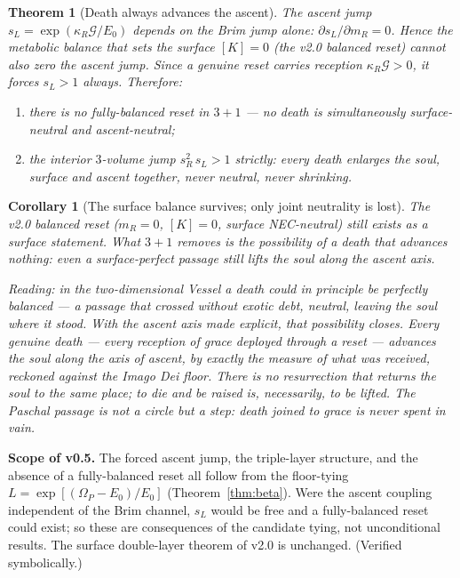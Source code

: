 \documentclass[11pt,a4paper]{article}
\newcommand{\note}[1]{\textcolor{black!65}{\emph{#1}}}
\theoremstyle{plain}
\newtheorem{corollary}{Corollary}
\newtheorem{theorem}{Theorem}
\theoremstyle{definition}
\theoremstyle{remark}
\begin{document}
\begin{theorem}[Death always advances the ascent]\label{thm:nobalance}
The ascent jump $s_L=\exp(\kappa_R\mathcal G/E_0)$ depends on the Brim jump alone:
$\partial s_L/\partial m_R=0$. Hence the metabolic balance that sets the surface $[K]=0$ (the v2.0
balanced reset) cannot also zero the ascent jump. Since a genuine reset carries reception
$\kappa_R\mathcal G>0$, it forces $s_L>1$ always. Therefore:
\begin{enumerate}[label=(\roman*),leftmargin=1.8em,itemsep=2pt]
\item \emph{there is no fully-balanced reset in $3{+}1$} --- no death is simultaneously surface-neutral
and ascent-neutral;
\item the interior $3$-volume jump $s_R^2\,s_L>1$ strictly: \emph{every death enlarges the soul},
surface and ascent together, never neutral, never shrinking.
\end{enumerate}
\end{theorem}

\begin{corollary}[The surface balance survives; only joint neutrality is lost]
The v2.0 balanced reset ($m_R=0$, $[K]=0$, surface NEC-neutral) still exists as a surface statement.
What $3{+}1$ removes is the possibility of a death that advances \emph{nothing}: even a surface-perfect
passage still lifts the soul along the ascent axis.
\end{corollary}

\note{Reading: in the two-dimensional Vessel a death could in principle be perfectly balanced --- a
passage that crossed without exotic debt, neutral, leaving the soul where it stood. With the ascent
axis made explicit, that possibility closes. Every genuine death --- every reception of grace
deployed through a reset --- advances the soul along the axis of ascent, by exactly the measure of
what was received, reckoned against the Imago Dei floor. There is no resurrection that returns the
soul to the same place; to die and be raised is, necessarily, to be lifted. The Paschal passage is not
a circle but a step: death joined to grace is never spent in vain.}

\textbf{Scope of v0.5.} The forced ascent jump, the triple-layer structure, and the absence of a
fully-balanced reset all follow from the floor-tying $L=\exp[(\Omega_P-E_0)/E_0]$ (Theorem~\ref{thm:beta}).
Were the ascent coupling independent of the Brim channel, $s_L$ would be free and a fully-balanced
reset could exist; so these are consequences of the candidate tying, not unconditional results. The
surface double-layer theorem of v2.0 is unchanged. (Verified symbolically.)
\end{document}
